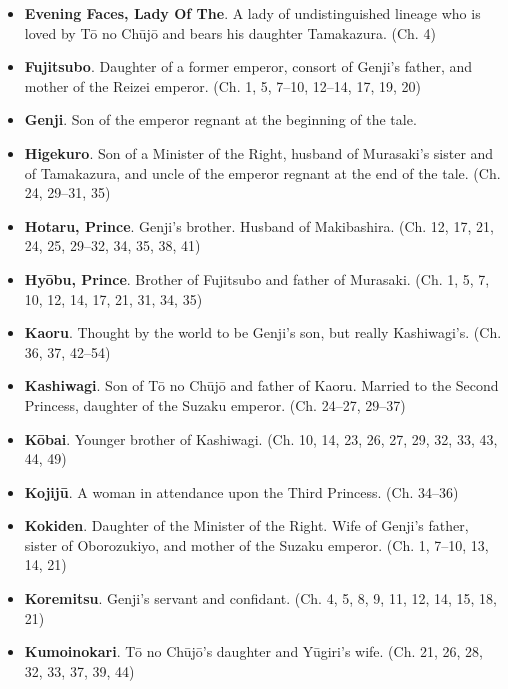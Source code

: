 \documentclass{article}
\begin{document}
\begin{multicols}{2}
\begin{small}
\begin{itemize}[
			label=,
			leftmargin=0em,
			rightmargin=-1.5em,
			itemindent=-2em,
			nosep,
		]
		\item \textbf{Evening Faces, Lady Of The}. A lady of undistinguished lineage who is loved by Tō no Chūjō and bears his daughter Tamakazura. (Ch. 4)

		\item \textbf{Fujitsubo}. Daughter of a former emperor, consort of Genji's father, and mother of the Reizei emperor. (Ch. 1, 5, 7--10, 12--14, 17, 19, 20)

		\item \textbf{Genji}. Son of the emperor regnant at the beginning of the tale.

		\item \textbf{Higekuro}. Son of a Minister of the Right, husband of Murasaki's sister and of Tamakazura, and uncle of the emperor regnant at the end of the tale. (Ch. 24, 29--31, 35)

		\item \textbf{Hotaru, Prince}. Genji's brother. Husband of Makibashira. (Ch. 12, 17, 21, 24, 25, 29--32, 34, 35, 38, 41)

		\item \textbf{Hyōbu, Prince}. Brother of Fujitsubo and father of Murasaki. (Ch. 1, 5, 7, 10, 12, 14, 17, 21, 31, 34, 35)

		\item \textbf{Kaoru}. Thought by the world to be Genji's son, but really Kashiwagi's. (Ch. 36, 37, 42--54)

		\item \textbf{Kashiwagi}. Son of Tō no Chūjō and father of Kaoru. Married to the Second Princess, daughter of the Suzaku emperor. (Ch. 24--27, 29--37)

		\item \textbf{Kōbai}. Younger brother of Kashiwagi. (Ch. 10, 14, 23, 26, 27, 29, 32, 33, 43, 44, 49)

		\item \textbf{Kojijū}. A woman in attendance upon the Third Princess. (Ch. 34--36)

		\item \textbf{Kokiden}. Daughter of the Minister of the Right. Wife of Genji's father, sister of Oborozukiyo, and mother of the Suzaku emperor. (Ch. 1, 7--10, 13, 14, 21)

		\item \textbf{Koremitsu}. Genji's servant and confidant. (Ch. 4, 5, 8, 9, 11, 12, 14, 15, 18, 21)

		\item \textbf{Kumoinokari}. Tō no Chūjō's daughter and Yūgiri's wife. (Ch. 21, 26, 28, 32, 33, 37, 39, 44)


\end{itemize}
\end{small}
\end{multicols}
\end{document}
